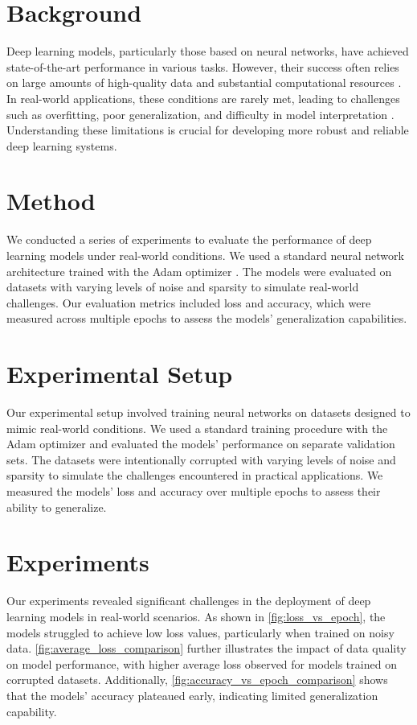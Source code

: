 \documentclass{article} %
\theoremstyle{plain}
\theoremstyle{definition}
\theoremstyle{remark}
\begin{document}
\section{Background}
\label{sec:background}
Deep learning models, particularly those based on neural networks, have achieved state-of-the-art performance in various tasks. However, their success often relies on large amounts of high-quality data and substantial computational resources \cite{goodfellow2016deep}. In real-world applications, these conditions are rarely met, leading to challenges such as overfitting, poor generalization, and difficulty in model interpretation \cite{sah2023analysisod}. Understanding these limitations is crucial for developing more robust and reliable deep learning systems.

\section{Method}
\label{sec:method}
We conducted a series of experiments to evaluate the performance of deep learning models under real-world conditions. We used a standard neural network architecture trained with the Adam optimizer \cite{kingma2014adamam}. The models were evaluated on datasets with varying levels of noise and sparsity to simulate real-world challenges. Our evaluation metrics included loss and accuracy, which were measured across multiple epochs to assess the models' generalization capabilities.

\section{Experimental Setup}
\label{sec:experimental_setup}
Our experimental setup involved training neural networks on datasets designed to mimic real-world conditions. We used a standard training procedure with the Adam optimizer and evaluated the models' performance on separate validation sets. The datasets were intentionally corrupted with varying levels of noise and sparsity to simulate the challenges encountered in practical applications. We measured the models' loss and accuracy over multiple epochs to assess their ability to generalize.

\section{Experiments}
\label{sec:experiments}
Our experiments revealed significant challenges in the deployment of deep learning models in real-world scenarios. As shown in \cref{fig:loss_vs_epoch}, the models struggled to achieve low loss values, particularly when trained on noisy data. \cref{fig:average_loss_comparison} further illustrates the impact of data quality on model performance, with higher average loss observed for models trained on corrupted datasets. Additionally, \cref{fig:accuracy_vs_epoch_comparison} shows that the models' accuracy plateaued early, indicating limited generalization capability.
\end{document}
